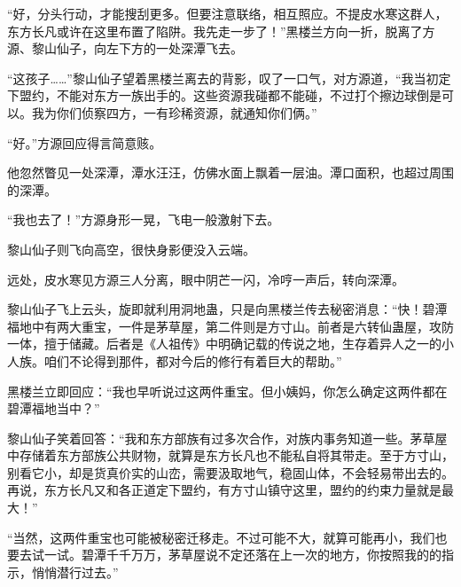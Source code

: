\begin{this_body}
“好，分头行动，才能搜刮更多。但要注意联络，相互照应。不提皮水寒这群人，东方长凡或许在这里布置了陷阱。我先走一步了！”黑楼兰方向一折，脱离了方源、黎山仙子，向左下方的一处深潭飞去。

“这孩子……”黎山仙子望着黑楼兰离去的背影，叹了一口气，对方源道，“我当初定下盟约，不能对东方一族出手的。这些资源我碰都不能碰，不过打个擦边球倒是可以。我为你们侦察四方，一有珍稀资源，就通知你们俩。”

“好。”方源回应得言简意赅。

他忽然瞥见一处深潭，潭水汪汪，仿佛水面上飘着一层油。潭口面积，也超过周围的深潭。

“我也去了！”方源身形一晃，飞电一般激射下去。

黎山仙子则飞向高空，很快身影便没入云端。

远处，皮水寒见方源三人分离，眼中阴芒一闪，冷哼一声后，转向深潭。

黎山仙子飞上云头，旋即就利用洞地蛊，只是向黑楼兰传去秘密消息：“快！碧潭福地中有两大重宝，一件是茅草屋，第二件则是方寸山。前者是六转仙蛊屋，攻防一体，擅于储藏。后者是《人祖传》中明确记载的传说之地，生存着异人之一的小人族。咱们不论得到那件，都对今后的修行有着巨大的帮助。”

黑楼兰立即回应：“我也早听说过这两件重宝。但小姨妈，你怎么确定这两件都在碧潭福地当中？”

黎山仙子笑着回答：“我和东方部族有过多次合作，对族内事务知道一些。茅草屋中存储着东方部族公共财物，就算是东方长凡也不能私自将其带走。至于方寸山，别看它小，却是货真价实的山峦，需要汲取地气，稳固山体，不会轻易带出去的。再说，东方长凡又和各正道定下盟约，有方寸山镇守这里，盟约的约束力量就是最大！”

“当然，这两件重宝也可能被秘密迁移走。不过可能不大，就算可能再小，我们也要去试一试。碧潭千千万万，茅草屋说不定还落在上一次的地方，你按照我的的指示，悄悄潜行过去。”

\end{this_body}

